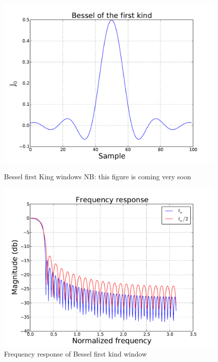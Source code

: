 \documentclass[useAMS,usenatbib]{mn2e}
\begin{document}
\begin{figure}
  \centering
\begin{minipage}{0.38\linewidth}\includegraphics[width=1\textwidth]{./Figures/bessel.pdf}\caption{Bessel 
first King windows NB: this figure is coming very soon}\label{fig:bessel}\end{minipage}
\hspace{1cm}
\begin{minipage}{0.38\linewidth}\includegraphics[width=1\textwidth]{./Figures/freq_resp_bessel.pdf}\caption{Frequency 
response of Bessel first kind window}\label{fig:freq_resp_bessel} \end {minipage}
\end{figure}
\end{document}
